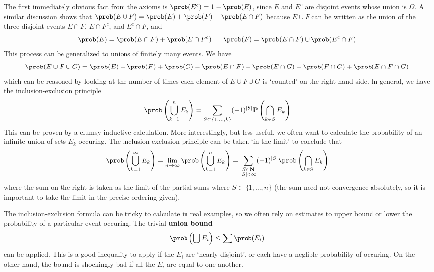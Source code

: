 The first immediately obvious fact from the axioms is $\prob(E^c) = 1 - \prob(E)$, since $E$ and $E^c$ are disjoint events whose union is $\Omega$. A similar discussion shows that $\prob(E \cup F) = \prob(E) + \prob(F) - \prob(E \cap F)$ because $E \cup F$ can be written as the union of the three disjoint events $E \cap F$, $E \cap F^c$, and $E^c \cap F$, and
%
\[ \prob(E) = \prob(E \cap F) + \prob(E \cap F^c)\ \ \ \ \ \prob(F) = \prob(E \cap F) \cup \prob(E^c \cap F) \]
%
This process can be generalized to unions of finitely many events. We have
%
\[ \prob(E \cup F \cup G) = \prob(E) + \prob(F) + \prob(G) - \prob(E \cap F) - \prob(E \cap G) - \prob(F \cap G) + \prob(E \cap F \cap G) \]
%
which can be reasoned by looking at the number of times each element of $E \cup F \cup G$ is `counted' on the right hand side. In general, we have the inclusion-exclusion principle
%
\[ \prob \left( \bigcup_{k = 1}^n E_k \right) = \sum_{S \subset \{ 1, \dots, k \}} (-1)^{|S|} \mathbf{P} \left( \bigcap_{k \in S} E_k \right) \]
%
This can be proven by a clumsy inductive calculation. More interestingly, but less useful, we often want to calculate the probability of an infinite union of sets $E_k$ occuring. The inclusion-exclusion principle can be taken `in the limit' to conclude that
%
\[ \prob \left(\bigcup_{k = 1}^\infty E_k \right) = \lim_{n \to \infty} \prob \left( \bigcup_{k = 1}^n E_k \right) = \sum_{\substack{S \subset \mathbf{N}\\|S| < \infty}} (-1)^{|S|} \prob \left( \bigcap_{k \in S} E_k \right) \]
%
where the sum on the right is taken as the limit of the partial sums where $S \subset \{ 1, \dots, n \}$ (the sum need not convergence absolutely, so it is important to take the limit in the precise ordering given).

The inclusion-exclusion formula can be tricky to calculate in real examples, so we often rely on estimates to upper bound or lower the probability of a particular event occuring. The trivial {\bf union bound}
%
\[ \prob \left( \bigcup E_i \right) \leq \sum \prob(E_i) \]
%
can be applied. This is a good inequality to apply if the $E_i$ are `nearly disjoint', or each have a neglible probability of occuring. On the other hand, the bound is shockingly bad if all the $E_i$ are equal to one another.

